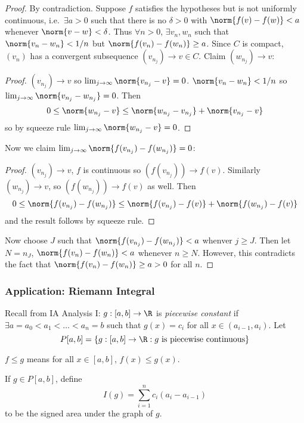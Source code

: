 \documentclass[a4paper]{article}
\theoremstyle{definition}
\begin{document}
\begin{proof}
  By contradiction. Suppose \(f\) satisfies the hypotheses but is not uniformly continuous, i.e.\ \(\exists a > 0\) such that there is no \(\delta > 0\) with \(\norm{f(v) - f (w)} < a\) whenever \(\norm{v - w} < \delta\). Thus \(\forall n > 0\), \(\exists v_n, w_n\) such that \(\norm{v_n - w_n} < 1/n\) but \(\norm{f(v_n) - f(w_n)} \geq a\). Since \(C\) is compact, \((v_n)\) has a convergent subsequence \((v_{n_j}) \to v \in C\). Claim \((w_{n_j}) \to v\):
  \begin{proof}
    \((v_{n_j}) \to  v\) so \(\lim_{j\to \infty}\norm{v_{n_j} - v} = 0\). \(\norm{v_n - w_n} < 1/n\) so \(\lim_{j\to \infty}\norm{v_{n_j} - w_{n_j}} = 0\). Then
    \[
      0 \leq \norm{w_{n_j} - v} \leq \norm{w_{n_j} - v_{n_j}} + \norm{v_{n_j} - v}
  \]
  so by squeeze rule \(\lim_{j\to \infty} \norm{w_{n_j} - v} = 0\).
  \end{proof}
  Now we claim \(\lim_{j\to \infty} \norm{f(v_{n_j}) - f(w_{n_j})} = 0\):
    \begin{proof}
      \((v_{n_j}) \to v\), \(f\) is continuous so \((f(v_{n_j})) \to f(v)\).
      Similarly \((w_{n_j}) \to v\), so \((f(w_{n_j})) \to f(v)\) as well. Then
      \[
        0 \leq \norm{f(v_{n_j}) - f(w_{n_j})} \leq \norm{f(v_{n_j}) - f(v)} + \norm{f(w_{n_j}) - f(v)}
      \]
      and the result follows by squeeze rule.
    \end{proof}
    Now choose \(J\) such that \(\norm{f(v_{n_j}) - f(w_{n_j})} < a\) whenver \(j \geq J\). Then let \(N = n_J\), \(\norm{f(v_n) - f(w_n)} < a\) whenever \(n \geq N\). However, this contradicts the fact that \(\norm{f(v_n) - f(w_n)} \geq a > 0\) for all \(n\).
\end{proof}

\subsubsection{Application: Riemann Integral}

Recall from IA Analysis I: \(g: [a, b] \to \R \) is \emph{piecewise constant} if \(\exists a = a_0 < a_1 < \dots < a_n = b\) such that \(g(x) = c_i\) for all \(x\in (a_{i-1}, a_i)\). Let
\[
  P[a, b] = \{g: [a, b] \to \R: g \text{ is piecewise continuous} \}
\]

\begin{notation}
  \(f \leq g\) means for all \(x \in [a, b]\), \(f(x) \leq g(x)\).
\end{notation}

If \(g \in P[a, b]\), define
\[
  I(g) = \sum_{i=1}^{n}c_i(a_i - a_{i-1})
\]
to be the signed area under the graph of \(g\).
\end{document}
